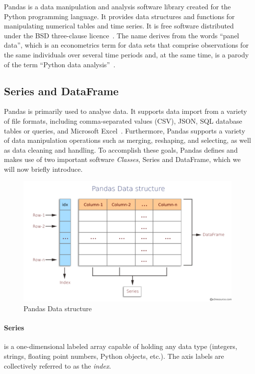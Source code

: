 Pandas is a data manipulation and analysis software library created for the Python programming language. It provides data structures and functions for manipulating numerical tables and time series. It is free software distributed under the BSD three-clause licence~\cite{Misc:OpenLDAP_license:oldap-2.7}.
The name derives from the words ``panel data'', which is an econometrics term for data sets that comprise observations for the same individuals over several time periods and, at the same time, is a parody of the term ``Python data analysis''~\cite{mckinney_data_2010}.

\subsection{Series and DataFrame}

Pandas is primarily used to analyse data. It supports data import from a variety of file formats, including comma-separated values (CSV), JSON, SQL database tables or queries, and Microsoft Excel~\cite{Misc:pandas_docs}.
Furthermore, Pandas supports a variety of data manipulation operations such as merging, reshaping, and selecting, as well as data cleaning and handling.
To accomplish these goals, Pandas defines and makes use of two important software \textit{Classes}, Series and DataFrame, which we will now briefly introduce.
\begin{figure}[ht]
  \centering
  \includegraphics[width=\linewidth]{content/chapter_3/images/datastructure.pdf}
  \caption{Pandas Data structure}
  \label{fig:pandas_dataframe}
\end{figure}

\paragraph{Series} is a one-dimensional labeled array capable of holding any data type (integers, strings, floating point numbers, Python objects, etc.). The axis labels are collectively referred to as the \textit{index}.

